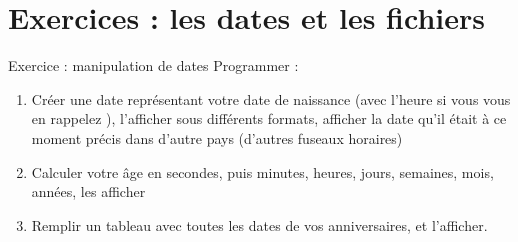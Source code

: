 
\section{Exercices : les dates et les fichiers}

\begin{frame}[containsverbatim]{Exercice  : manipulation de dates}
	Programmer :
	\begin{enumerate}
		\item Créer une date représentant votre date de naissance (avec l’heure si vous vous en rappelez \smiley), l’afficher sous différents formats, afficher la date qu’il était à ce moment précis dans d’autre pays (d’autres fuseaux horaires)
		\item Calculer votre âge en secondes, puis minutes, heures, jours, semaines, mois, années, les afficher
		\item Remplir un tableau avec toutes les dates de vos anniversaires, et l’afficher.
	\end{enumerate}
\end{frame}

 
